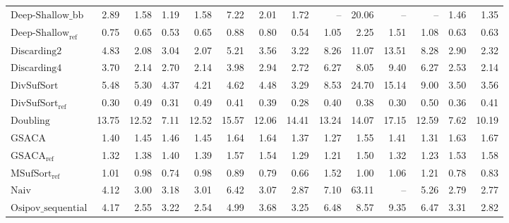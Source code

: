\begin{table}
{\begin{tabular}{lrrrrrrrrrrrrr}
    $\text{Deep-Shallow\_bb}$ & 2.89 & 1.58 & 1.19 & 1.58 & 7.22 & 2.01 & 1.72 & {\color{darkgray}--} & 20.06 & {\color{darkgray}--} & {\color{darkgray}--} & 1.46 & 1.35 \\
    $\text{Deep-Shallow}_{\text{ref}}$ & 0.75 & {\color{green!60!black}0.65} & {\color{green!60!black}0.53} & {\color{green!60!black}0.65} & 0.88 & 0.80 & 0.54 & 1.05 & 2.25 & 1.51 & 1.08 & 0.63 & 0.63 \\
    $\text{Discarding2}$ & 4.83 & 2.08 & 3.04 & 2.07 & 5.21 & 3.56 & 3.22 & 8.26 & 11.07 & {\color{red}13.51} & {\color{red}8.28} & 2.90 & 2.32 \\
    $\text{Discarding4}$ & 3.70 & 2.14 & 2.70 & 2.14 & 3.98 & 2.94 & 2.72 & 6.27 & 8.05 & 9.40 & 6.27 & 2.53 & 2.14 \\
    $\text{DivSufSort}$ & 5.48 & 5.30 & 4.37 & 4.21 & 4.62 & 4.48 & 3.29 & 8.53 & {\color{red}24.70} & {\color{red}15.14} & {\color{red}9.00} & 3.50 & 3.56 \\
    $\text{DivSufSort}_{\text{ref}}$ & {\color{green!60!black}0.30} & {\color{green!60!black}0.49} & {\color{green!60!black}0.31} & {\color{green!60!black}0.49} & {\color{green!60!black}0.41} & {\color{green!60!black}0.39} & {\color{green!60!black}0.28} & {\color{green!60!black}0.40} & {\color{green!60!black}0.38} & {\color{green!60!black}0.30} & {\color{green!60!black}0.50} & {\color{green!60!black}0.36} & {\color{green!60!black}0.41} \\
    $\text{Doubling}$ & {\color{red}13.75} & {\color{red}12.52} & {\color{red}7.11} & {\color{red}12.52} & {\color{red}15.57} & {\color{red}12.06} & {\color{red}14.41} & {\color{red}13.24} & 14.07 & {\color{red}17.15} & {\color{red}12.59} & {\color{red}7.62} & {\color{red}10.19} \\
    $\text{GSACA}$ & 1.40 & 1.45 & 1.46 & 1.45 & 1.64 & 1.64 & 1.37 & 1.27 & 1.55 & 1.41 & 1.31 & 1.63 & 1.67 \\
    $\text{GSACA}_{\text{ref}}$ & 1.32 & 1.38 & 1.40 & 1.39 & 1.57 & 1.54 & 1.29 & 1.21 & 1.50 & 1.32 & 1.23 & 1.53 & 1.58 \\
    $\text{MSufSort}_{\text{ref}}$ & 1.01 & 0.98 & 0.74 & 0.98 & 0.89 & {\color{green!60!black}0.79} & 0.66 & 1.52 & 1.00 & 1.06 & 1.21 & 0.78 & 0.83 \\
    $\text{Naiv}$ & 4.12 & 3.00 & 3.18 & 3.01 & 6.42 & 3.07 & 2.87 & 7.10 & {\color{red}63.11} & {\color{darkgray}--} & 5.26 & 2.79 & 2.77 \\
    $\text{Osipov\_sequential}$ & 4.17 & 2.55 & 3.22 & 2.54 & 4.99 & 3.68 & 3.25 & 6.48 & 8.57 & 9.35 & 6.47 & 3.31 & 2.82 \\

\end{tabular}}
\end{table}
